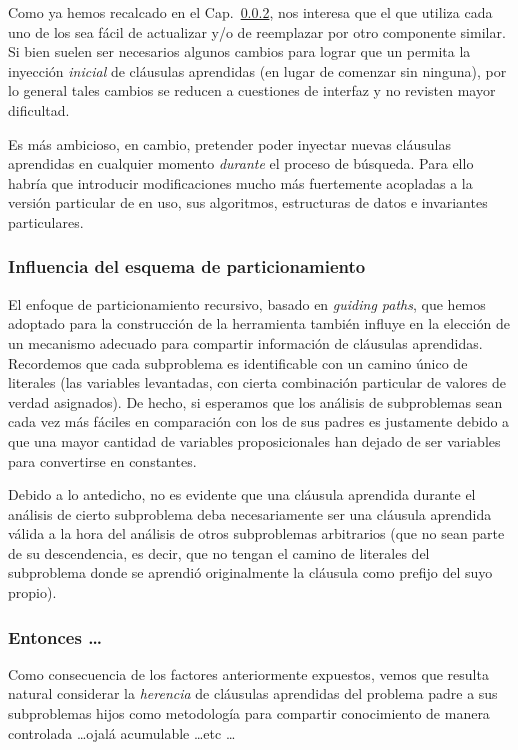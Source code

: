 Como ya hemos recalcado en el Cap.~\ref{}, nos interesa que el \ssolver que utiliza cada uno de los \ws sea fácil de actualizar y/o de reemplazar por otro componente \ots similar. Si bien suelen ser necesarios algunos cambios para lograr que un \ssolver permita la inyección \emph{inicial} de cláusulas aprendidas (en lugar de comenzar sin ninguna), por lo general tales cambios se reducen a cuestiones de interfaz y no revisten mayor dificultad.

Es más ambicioso, en cambio, pretender poder inyectar nuevas cláusulas aprendidas en cualquier momento \emph{durante} el proceso de búsqueda. Para ello habría que introducir modificaciones mucho más fuertemente acopladas a la versión particular de \ssolver en uso, sus algoritmos, estructuras de datos e invariantes particulares.


\subsubsection{Influencia del esquema de particionamiento}

El enfoque de particionamiento recursivo, basado en \emph{guiding paths}, que hemos adoptado para la construcción de la herramienta también influye en la elección de un mecanismo adecuado para compartir información de cláusulas aprendidas. Recordemos que cada subproblema es identificable con un camino único de literales (las variables levantadas, con cierta combinación particular de valores de verdad asignados). De hecho, si esperamos que los análisis de subproblemas sean cada vez más fáciles en comparación con los de sus padres es justamente debido a que una mayor cantidad de variables proposicionales han dejado de ser variables para convertirse en constantes.

Debido a lo antedicho, no es evidente que una cláusula aprendida durante el análisis de cierto subproblema deba necesariamente ser una cláusula aprendida válida a la hora del análisis de otros subproblemas arbitrarios (que no sean parte de su descendencia, es decir, que no tengan el camino de literales del subproblema donde se aprendió originalmente la cláusula como prefijo del suyo propio).


\subsubsection{Entonces \ldots}

Como consecuencia de los factores anteriormente expuestos, vemos que resulta natural considerar la \emph{herencia} de cláusulas aprendidas del problema padre a sus subproblemas hijos como metodología para compartir conocimiento de manera controlada \ldots ojalá acumulable \ldots etc \ldots


